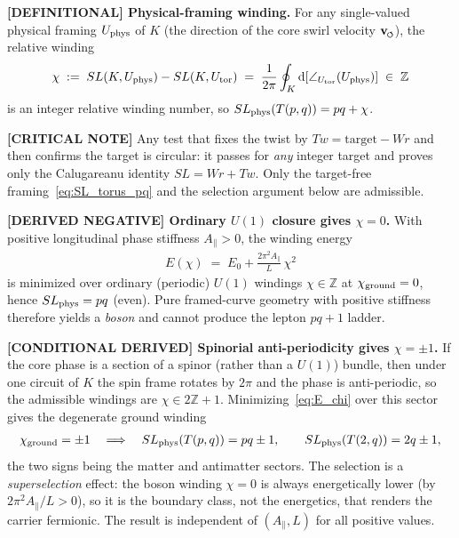 \documentclass[11pt]{article}
\theoremstyle{definition}
\theoremstyle{plain}
\theoremstyle{remark}
\newcommand{\swirlarrow}{\mathchoice{\mkern-2mu\scriptstyle\boldsymbol{\circlearrowleft}}{\mkern-2mu\scriptstyle\boldsymbol{\circlearrowleft}}{\mkern-2mu\scriptscriptstyle\boldsymbol{\circlearrowleft}}{\mkern-2mu\scriptscriptstyle\boldsymbol{\circlearrowleft}}}
\newcommand{\vswirl}{\mathbf{v}_{\swirlarrow}}
\begin{document}
        \textbf{[DEFINITIONAL] Physical-framing winding.}
        For any single-valued physical framing $U_{\rm phys}$ of $K$ (the direction of the core
        swirl velocity $\vswirl$), the relative winding
        \begin{align}
            \chi \;:=\; SL(K,U_{\rm phys})-SL(K,U_{\rm tor})
                  \;=\; \frac{1}{2\pi}\oint_K \mathrm{d}\!\left[\angle_{U_{\rm tor}}(U_{\rm phys})\right]
                  \;\in\; \mathbb{Z}
            \label{eq:chi_def}
        \end{align}
        is an integer relative winding number, so $SL_{\rm phys}(T(p,q))=pq+\chi$.

        \textbf{[CRITICAL NOTE]} Any test that fixes the twist by $Tw=\mathrm{target}-Wr$ and
        then confirms the target is circular: it passes for \emph{any} integer target and
        proves only the Calugareanu identity $SL=Wr+Tw$. Only the target-free
        framing~\eqref{eq:SL_torus_pq} and the selection argument below are admissible.

        \textbf{[DERIVED NEGATIVE] Ordinary $U(1)$ closure gives $\chi=0$.}
        With positive longitudinal phase stiffness $A_\parallel>0$, the winding energy
        \begin{align}
            E(\chi)\;=\;E_0+\frac{2\pi^2 A_\parallel}{L}\,\chi^2
            \label{eq:E_chi}
        \end{align}
        is minimized over ordinary (periodic) $U(1)$ windings $\chi\in\mathbb{Z}$ at
        $\chi_{\rm ground}=0$, hence $SL_{\rm phys}=pq$ (even). Pure framed-curve geometry with
        positive stiffness therefore yields a \emph{boson} and cannot produce the lepton
        $pq+1$ ladder.

        \textbf{[CONDITIONAL DERIVED] Spinorial anti-periodicity gives $\chi=\pm1$.}
        If the core phase is a section of a spinor (rather than a $U(1)$) bundle, then under one
        circuit of $K$ the spin frame rotates by $2\pi$ and the phase is anti-periodic, so the
        admissible windings are $\chi\in 2\mathbb{Z}+1$. Minimizing~\eqref{eq:E_chi} over this
        sector gives the degenerate ground winding
        \begin{align}
            \chi_{\rm ground}=\pm1 \quad\Longrightarrow\quad
            SL_{\rm phys}(T(p,q))=pq\pm1,
            \qquad SL_{\rm phys}(T(2,q))=2q\pm1,
            \label{eq:SL_phys_pq1}
        \end{align}
        the two signs being the matter and antimatter sectors. The selection is a
        \emph{superselection} effect: the boson winding $\chi=0$ is always energetically lower
        (by $2\pi^2 A_\parallel/L>0$), so it is the boundary class, not the energetics, that
        renders the carrier fermionic. The result is independent of $(A_\parallel,L)$ for all
        positive values.
\end{document}
